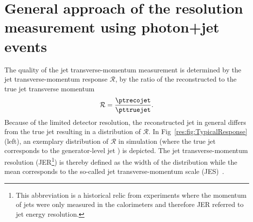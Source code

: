 \FloatBarrier
\chapter{General approach of the resolution measurement using photon+jet events}
\label{res:ch:GeneralApproach}
The quality of the jet transverse-momentum measurement is determined by the jet transverse-momentum response $\mathcal{R}$, \ie by the ratio of the reconstructed to the true jet transverse momentum 
\begin{equation}\label{res:eq:responseFormula}
\mathcal{R} =  \frac{\ptrecojet}{\pttruejet}.
\end{equation}
Because of the limited detector resolution, the reconstructed jet \pt in general differs from the true jet \pt resulting in a distribution of $\mathcal{R}$.
In Fig~\ref{res:fig:TypicalResponse} (left), an exemplary distribution of $\mathcal{R}$ in simulation (where the true jet \pt corresponds to the generator-level jet \pt) is depicted.
The jet transverse-momentum resolution (JER\footnote{This abbreviation is a historical relic from experiments where the momentum of jets were only measured in the calorimeters and therefore JER referred to jet energy resolution.}) is thereby defined as the width of the distribution while the mean corresponds to the so-called jet transverse-momentum scale (JES)~\cite{bib:CMS:JME_PAS}.




